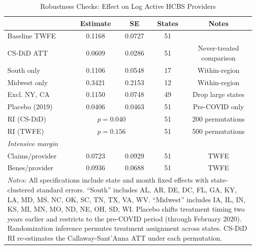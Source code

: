 \begin{table}[htbp]
\centering
\caption{Robustness Checks: Effect on Log Active HCBS Providers}
\label{tab:robustness}
\begin{tabular}{lcccc}
\hline\hline
 & Estimate & SE & States & Notes \\
\hline
Baseline TWFE & 0.1168 & 0.0727 & 51 & \\
CS-DiD ATT & 0.0609 & 0.0286 & 51 & Never-treated comparison \\
South only & 0.1106 & 0.0548 & 17 & Within-region \\
Midwest only & 0.3421 & 0.2153 & 12 & Within-region \\
Excl. NY, CA & 0.1150 & 0.0748 & 49 & Drop large states \\
Placebo (2019) & 0.0406 & 0.0463 & 51 & Pre-COVID only \\
RI (CS-DiD) & \multicolumn{2}{c}{$p = 0.040$} & 51 & 200 permutations \\
RI (TWFE) & \multicolumn{2}{c}{$p = 0.156$} & 51 & 500 permutations \\
\hline
\multicolumn{5}{l}{\textit{Intensive margin}} \\
Claims/provider & 0.0723 & 0.0929 & 51 & TWFE \\
Benes/provider & 0.0936 & 0.0688 & 51 & TWFE \\
\hline\hline
\multicolumn{5}{p{13cm}}{\footnotesize \textit{Notes:} All specifications include state and month fixed effects with state-clustered standard errors. ``South'' includes AL, AR, DE, DC, FL, GA, KY, LA, MD, MS, NC, OK, SC, TN, TX, VA, WV. ``Midwest'' includes IA, IL, IN, KS, MI, MN, MO, ND, NE, OH, SD, WI. Placebo shifts treatment timing two years earlier and restricts to the pre-COVID period (through February 2020). Randomization inference permutes treatment assignment across states. CS-DiD RI re-estimates the Callaway-Sant'Anna ATT under each permutation.} \\
\end{tabular}
\end{table}

